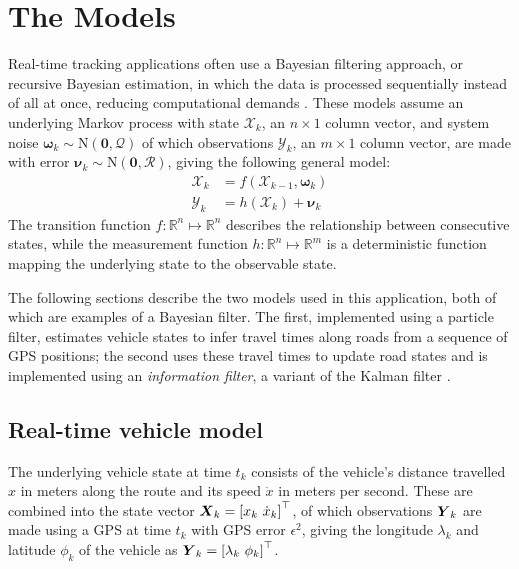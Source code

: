 \section{The Models}
\label{sec:models}

Real-time tracking applications often use
a Bayesian filtering approach,
or recursive Bayesian estimation,
in which the data is processed sequentially instead of all at once,
reducing computational demands
\citep{Anderson_2012}.
These models assume an underlying Markov process with state $\boldsymbol{\mathcal{X}}_k$,
an $n\times1$ column vector,
and system noise $\boldsymbol{\omega}_k\sim\mathrm{N}(\boldsymbol{0},\mathcal{Q})$ 
of which observations $\boldsymbol{\mathcal{Y}}_k$,
an $m\times1$ column vector, are made
with error $\boldsymbol{\nu}_k\sim\mathrm{N}(\boldsymbol{0},\mathcal{R})$,
giving the following general model:
\begin{equation}
\label{eq:rbe_model}
\begin{split}
\boldsymbol{\mathcal{X}}_k &= f(\boldsymbol{\mathcal{X}}_{k-1}, \boldsymbol{\omega}_k) \\
\boldsymbol{\mathcal{Y}}_k &= h(\boldsymbol{\mathcal{X}}_k) + \boldsymbol{\nu}_k
\end{split}
\end{equation}
The transition function $f:\mathbb{R}^n\mapsto\mathbb{R}^n$ 
describes the relationship between consecutive states,
while the measurement function $h:\mathbb{R}^n\mapsto\mathbb{R}^m$ is a deterministic function
mapping the underlying state to the observable state.



The following sections describe the two models used in this application,
both of which are examples of a Bayesian filter.
The first, implemented using a particle filter, estimates vehicle states
to infer travel times along roads from a sequence of GPS positions;
the second uses these travel times to update road states 
and is implemented using an \emph{information filter},
a variant of the Kalman filter \citep{Anderson_2012}.

\subsection{Real-time vehicle model}
\label{sec:pf}

The underlying vehicle state at time $t_k$ consists of
the vehicle's distance travelled $x$ in meters along the route and
its speed $\dot x$ in meters per second.
These are combined into the state vector
$\mbox{$\boldsymbol{X}$}_k = \left[x_k\ \dot x_k\right]^\top$,
of which observations $\mbox{$\boldsymbol{Y}$}_k$ are made using a GPS at time $t_k$
with GPS error $\epsilon^2$,
giving the longitude $\lambda_k$ and latitude $\phi_k$ of the vehicle
as $\bY_k = \left[\lambda_k\ \phi_k \right]^\top$.

